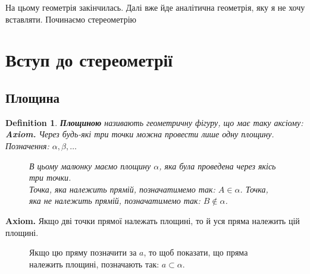 \documentclass[a4paper, 10pt]{article}
\theoremstyle{theoremdd}
\theoremstyle{theoremdd}
\theoremstyle{theoremdd}
\newtheorem{definition}[theorem]{Definition}
\theoremstyle{theoremdd}
\theoremstyle{theoremdd}
\theoremstyle{theoremdd}
\theoremstyle{theoremdd}
\theoremstyle{theoremdd}
\theoremstyle{theoremdd}
\begin{document}
\newpage
На цьому геометрія закінчилась. Далі вже йде аналітична геометрія, яку я не хочу вставляти. Починаємо стереометрію
\newpage

\section{Вступ до стереометрії}
\subsection{Площина}
\begin{definition}
\textbf{Площиною} називають геометричну фігуру, що має таку аксіому:\\
\textbf{Axiom.} Через будь-які три точки можна провести лише одну площину.\\
Позначення: $\alpha,\beta,\dots$
\begin{figure}[H]
\centering
{}
\caption*{В цьому малюнку маємо площину $\alpha$, яка була проведена через якісь три точки. \\
Точка, яка належить прямій, позначатимемо так: $A \in \alpha$. Точка, яка не належить прямій, позначатимемо так: $B \not\in \alpha$.}
\end{figure}
\end{definition}

\textbf{Axiom.} Якщо дві точки прямої належать площині, то й уся пряма належить цій площині.

\begin{figure}[H]
\centering
{}
\caption*{Якщо цю пряму позначити за $a$, то щоб показати, що пряма належить площині, позначають так: $a \subset \alpha$.}
\end{figure}
\end{document}
